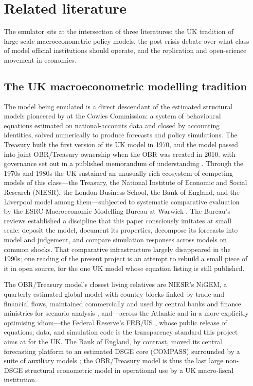 \section{Related literature}
\label{sec:literature}

The emulator sits at the intersection of three literatures: the UK tradition of large-scale macroeconometric policy models, the post-crisis debate over what class of model official institutions should operate, and the replication and open-science movement in economics.

\subsection{The UK macroeconometric modelling tradition}

The model being emulated is a direct descendant of the estimated structural models pioneered by \citet{klein1950} at the Cowles Commission: a system of behavioural equations estimated on national-accounts data and closed by accounting identities, solved numerically to produce forecasts and policy simulations. The Treasury built the first version of its UK model in 1970, and the model passed into joint OBR/Treasury ownership when the OBR was created in 2010, with governance set out in a published memorandum of understanding \citep{obrmou, obr2013model}. Through the 1970s and 1980s the UK sustained an unusually rich ecosystem of competing models of this class---the Treasury, the National Institute of Economic and Social Research (NIESR), the London Business School, the Bank of England, and the Liverpool model among them---subjected to systematic comparative evaluation by the ESRC Macroeconomic Modelling Bureau at Warwick \citep{wallis1987}. The Bureau's reviews established a discipline that this paper consciously imitates at small scale: deposit the model, document its properties, decompose its forecasts into model and judgement, and compare simulation responses across models on common shocks. That comparative infrastructure largely disappeared in the 1990s; one reading of the present project is an attempt to rebuild a small piece of it in open source, for the one UK model whose equation listing is still published.

The OBR/Treasury model's closest living relatives are NIESR's NiGEM, a quarterly estimated global model with country blocks linked by trade and financial flows, maintained commercially and used by central banks and finance ministries for scenario analysis \citep{hantzsche2018}, and---across the Atlantic and in a more explicitly optimising idiom---the Federal Reserve's FRB/US \citep{brayton1996}, whose public release of equations, data, and simulation code is the transparency standard this project aims at for the UK. The Bank of England, by contrast, moved its central forecasting platform to an estimated DSGE core (COMPASS) surrounded by a suite of auxiliary models \citep{burgess2013}; the OBR/Treasury model is thus the last large non-DSGE structural econometric model in operational use by a UK macro-fiscal institution.

